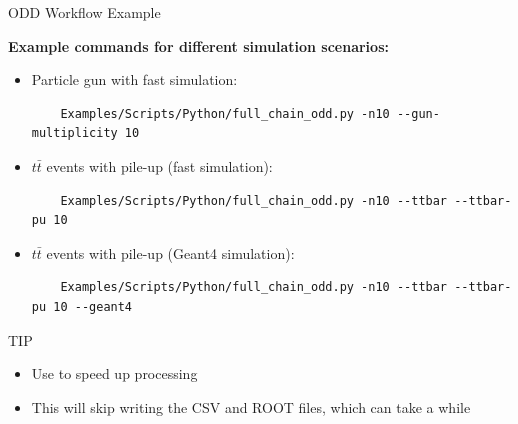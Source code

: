 \documentclass[lualatex,aspectratio=169,t,13pt,dvipsnames]{beamer}
\begin{document}
\begin{frame}[fragile,c]{ODD Workflow Example}


    \textbf{Example commands for different simulation scenarios:}
    \begin{itemize}
      \item Particle gun with fast simulation:
  
  \begin{verbatim}
    Examples/Scripts/Python/full_chain_odd.py -n10 --gun-multiplicity 10
  \end{verbatim}
  
    \item $t\bar{t}$ events with pile-up (fast simulation):
  
  \begin{verbatim}
    Examples/Scripts/Python/full_chain_odd.py -n10 --ttbar --ttbar-pu 10
  \end{verbatim}
  
    \item $t\bar{t}$ events with pile-up (Geant4 simulation):
  
  \begin{verbatim}
    Examples/Scripts/Python/full_chain_odd.py -n10 --ttbar --ttbar-pu 10 --geant4
  \end{verbatim}
  
  \end{itemize}

  \begin{successblock}{ TIP}
    \begin{itemize}
      \item Use  to speed up processing
      \item This will skip writing the CSV and ROOT files, which can take a while
    \end{itemize}
  \end{successblock}
\end{frame}
\end{document}
